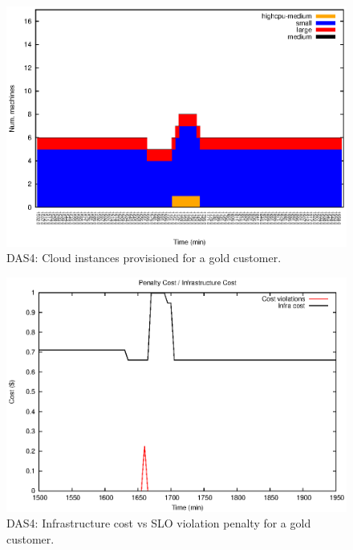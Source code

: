 \begin{figure}
  \begin{center}
    \includegraphics[width=.85\linewidth]{images/exps2011/high/das/inst_type_machines_filtered.eps}
  \end{center}
\vspace{-5mm}
  \caption{DAS4: Cloud instances provisioned for a gold customer.}
  \label{highInstances}
\end{figure}

\begin{figure}
  \begin{center}
    \includegraphics[width=.85\linewidth]{images/exps2011/high/das/penaltyVScost_filtered.eps}
  \end{center}
\vspace{-5mm}
  \caption{DAS4: Infrastructure cost vs SLO violation penalty for a gold customer.}
  \label{highPenalty}
\end{figure}

